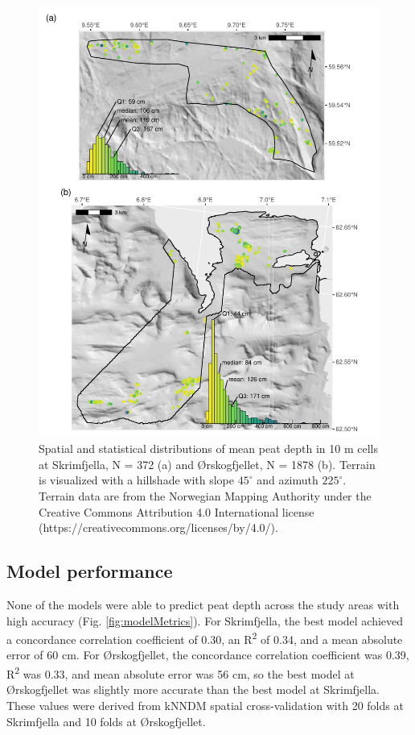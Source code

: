 \documentclass[soil, manuscript]{copernicus}
\begin{document}
\begin{figure}
\includegraphics[height=0.81\textheight]{figures/map-distribution} \caption{Spatial and statistical distributions of mean peat depth in 10 m cells at Skrimfjella, N = 372 (a) and Ørskogfjellet, N = 1878 (b). Terrain is visualized with a hillshade with slope $45^\circ$ and azimuth $225^\circ$. Terrain data are from the Norwegian Mapping Authority under the Creative Commons Attribution 4.0 International license (https://creativecommons.org/licenses/by/4.0/).}\label{fig:map-distribution}
\end{figure}

\subsection{Model performance}

None of the models were able to predict peat depth across the study areas with high accuracy (Fig. \ref{fig:modelMetrics}).
For Skrimfjella, the best model achieved a concordance correlation coefficient of 0.30, an R\textsuperscript{2} of 0.34, and a mean absolute error of 60 cm.
For Ørskogfjellet, the concordance correlation coefficient was 0.39, R\textsuperscript{2} was 0.33, and mean absolute error was 56 cm, so the best model at Ørskogfjellet was slightly more accurate than the best model at Skrimfjella.
These values were derived from kNNDM spatial cross-validation with 20 folds at Skrimfjella and 10 folds at Ørskogfjellet.
\end{document}
